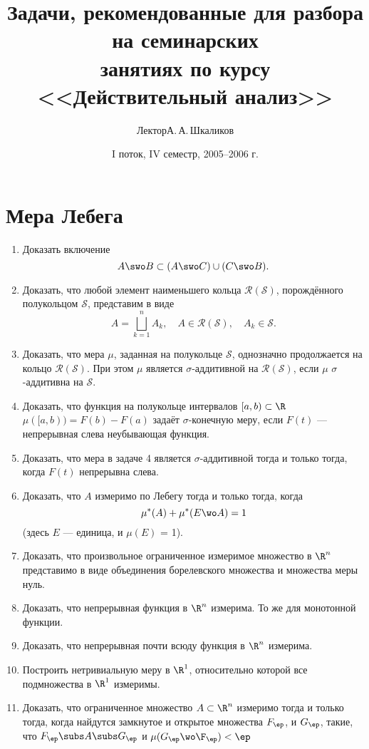 \documentclass[a4paper]{article}
\title{Задачи, рекомендованные для разбора на семинарских\\
занятиях по курсу <<Действительный анализ>>}
\author{Лектор\т А.\,А.\,Шкаликов}
\date{I поток, IV семестр, 2005--2006 г.}
\begin{document}
\maketitle

\dmvntrail

\section{Мера Лебега}

\begin{enumerate}
\setlength{\itemsep}{-3pt}
\item
Доказать включение
$$
A\swo B\subset (A\swo C)\cup (C\swo B).
$$
\item
Доказать, что любой элемент наименьшего кольца
$\mathcal{R}(\mathcal{S})$, порождённого полукольцом
$\mathcal{S}$, представим в виде
$$
A=\bigsqcup\limits_{k=1}^n A_k,\quad A\in
\mathcal{R}(\mathcal{S}),\quad A_k\in \mathcal{S}.
$$
\item
Доказать, что мера $\mu$, заданная на полукольце $\mathcal{S}$,
однозначно продолжается на кольцо $\mathcal{R}(\mathcal{S})$. При
этом $\mu$ является $\sigma$-аддитивной на
$\mathcal{R}(\mathcal{S})$, если $\mu$ $\sigma$-аддитивна на
$\mathcal{S}$.
\item
Доказать, что функция на полукольце интервалов $[a, b)\subset \R$
$\mu ([a, b))=F(b)-F(a)$ задаёт $\sigma$-конечную меру, если
$F(t)$ --- непрерывная слева неубывающая функция.
\item
Доказать, что мера в задаче 4 является $\sigma$-аддитивной тогда и
только тогда, когда $F(t)$ непрерывна слева.
\item
Доказать, что $A$ измеримо по Лебегу тогда и только тогда, когда
$$
\mu^*(A)+\mu^*(E\wo A)=1
$$
(здесь $E$ --- единица, и $\mu(E)$ = 1).
\item
Доказать, что произвольное ограниченное измеримое множество в
$\R^n$ представимо в виде объединения борелевского множества и
множества меры нуль.
\item
Доказать, что непрерывная функция в $\R^n$ измерима. То же для
монотонной функции.
\item
Доказать, что непрерывная почти всюду функция в $\R^n$ измерима.
\item
Построить нетривиальную меру в $\R^1$, относительно которой все
подмножества в $\R^1$ измеримы.
\item
Доказать, что ограниченное множество $A\subset \R^n$ измеримо
тогда и только тогда, когда найдутся замкнутое и открытое
множества $F_\ep$, и $G_\ep$, такие, что $F_\ep\subs A\subs G_\ep$
и $\mu (G_\ep\wo\F_\ep)<\ep$

\end{enumerate}
\end{document}
